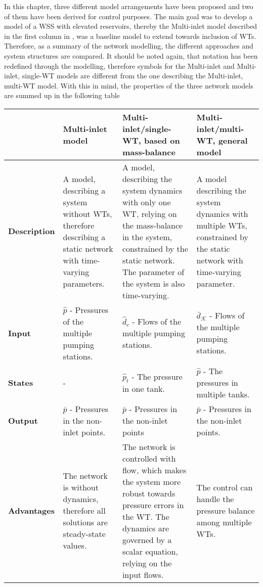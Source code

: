 In this chapter, three different model arrangements have been proposed and two of them have been derived for control purposes. The main goal was to develop a model of a WSS with elevated reservoirs, thereby the Multi-inlet model described in the first column in , was a baseline model to extend towards inclusion of WTs. Therefore, as a summary of the network modelling, the different approaches and system structures are compared. It should be noted again, that notation has been redefined through the modelling, therefore symbols for the Multi-inlet and Multi-inlet, single-WT models are different from the one describing the Multi-inlet, multi-WT model. With this in mind, the properties of the three network models are summed up in the following table
\vspace{-2mm}
\begin{center}
    \begin{tabular}{ | >{\centering\arraybackslash}m{1.8cm} | >{\centering\arraybackslash}m{3.6cm} | >{\centering\arraybackslash}m{3.6cm} | >{\centering\arraybackslash}m{3.6cm} |}
    \hline
    \multirow{1}{*}
     & \textbf{Multi-inlet model} & \textbf{Multi-inlet/single-WT, based on mass-balance} & \textbf{Multi-inlet/multi-WT, general model} \\ 
     \hline
     \multirow{1}{*}
    \textbf{Description} & A model, describing a system without WTs, therefore describing a static network with time-varying parameters. & A model, describing the system dynamics with only one WT, relying on the mass-balance in the system, constrained by the static network. The parameter of the system is also time-varying. & A model describing the system dynamics with multiple WTs, constrained by the static network with time-varying parameter.\\ 
    \hline
      \multirow{1}{*}
    \textbf{Input} & $\hat{p}$ - Pressures of the multiple pumping stations. & $\hat{d}_c$ - Flows of the multiple pumping stations. & $\bar{d}_{\mathcal{K}}$ - Flows of the multiple pumping stations.\\ 
    \hline
      \multirow{1}{*}
    \textbf{States} & - & $\hat{p}_t$ - The pressure in one tank. & $\hat{p}$ - The pressures in multiple tanks.\\ 
    \hline
      \multirow{1}{*}
    \textbf{Output} & $\bar{p}$ - Pressures in the non-inlet points. & $\bar{p}$ - Pressures in the non-inlet points & $\bar{p}$ - Pressures in the non-inlet points.\\ 
    \hline
      \multirow{1}{*}
    \textbf{Advantages} & The network is without dynamics, therefore all solutions are steady-state values. & The network is controlled with flow, which makes the system more robust towards pressure errors in the WT. The dynamics are governed by a scalar equation, relying on the input flows.  & The control can handle the pressure balance among multiple WTs.\\ 

\end{tabular}
\end{center}
